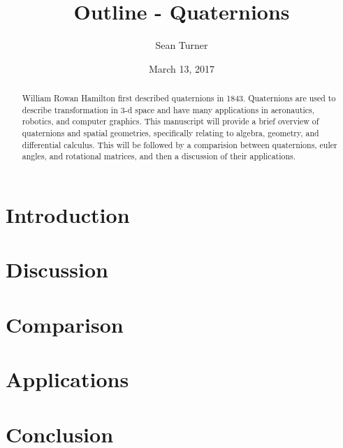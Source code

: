 \documentclass{article}
\theoremstyle{definition}
\begin{document}
\nocite{*}
\title{Outline - Quaternions}
\date{March 13, 2017}
\author{Sean Turner}

\maketitle

\begin{abstract}
\noindent William Rowan Hamilton first described quaternions in 1843.
Quaternions are used to describe transformation in 3-d space and have many applications in aeronautics, robotics, and computer graphics.
This manuscript will provide a brief overview of quaternions and spatial geometries, specifically relating to algebra, geometry, and differential calculus.
This will be followed by a comparision between quaternions, euler angles, and rotational matrices, and then a discussion of their applications.
\end{abstract}

\section{Introduction}


\section{Discussion}
\label{sec:disc}


\section{Comparison}
\label{sec:comp}


\section{Applications}
\label{sec:app}


\section{Conclusion}
\label{sec:conc}


\newpage


\end{document}

